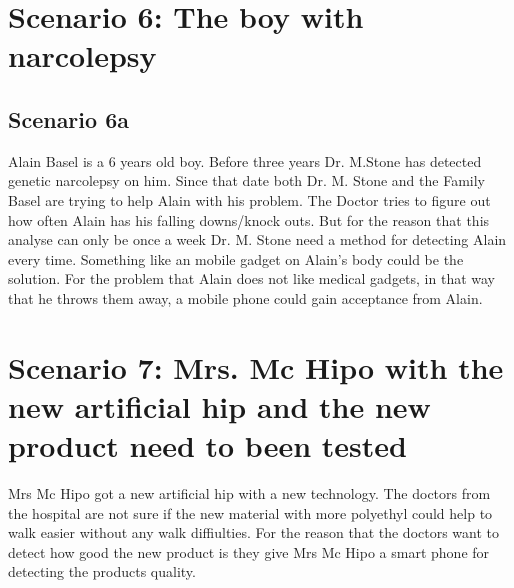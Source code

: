 \section{Scenario 6: The boy with narcolepsy}

\subsection*{Scenario 6a} 
Alain Basel is a 6 years old boy. Before three years Dr. M.Stone has detected genetic narcolepsy on him. Since that date both Dr. M. Stone and the Family Basel are trying to help Alain with his problem. The Doctor tries to figure out how often Alain has his falling downs/knock outs. But for the reason that this analyse can only be once a week Dr. M. Stone need a method for detecting Alain every time. Something like an mobile gadget on Alain’s body could be the solution. For the problem that Alain does not like medical gadgets, in that way that he throws them away, a mobile phone could gain acceptance from Alain.




\section{Scenario 7: Mrs. Mc Hipo with the new artificial hip and the new product need to been tested}

Mrs Mc Hipo got a new artificial hip with a new technology. The doctors from the hospital are not sure if the new material with more polyethyl could help to walk easier without any walk diffiulties. For the reason that the doctors want to detect how good the new product is they give Mrs Mc Hipo a smart phone for detecting the products quality.